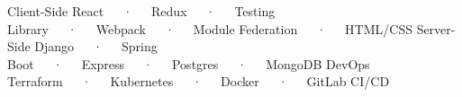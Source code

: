 

\begin{cvtechnicals}
  \vspace{1mm} %
  \cvtechnical
  {Client-Side} %
  {React~~~·~~~Redux~~~·~~~Testing Library~~~·~~~Webpack~~~·~~~Module Federation~~~·~~~HTML/CSS} %
  {Server-Side} %
  {Django~~~·~~~Spring Boot~~~·~~~Express~~~·~~~Postgres~~~·~~~MongoDB} %
  {DevOps} %
  {Terraform~~~·~~~Kubernetes~~~·~~~Docker~~~·~~~GitLab CI/CD} %
\end{cvtechnicals}